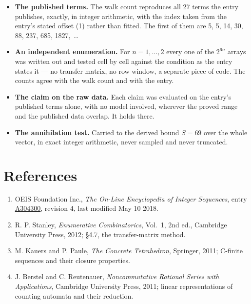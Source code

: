 \documentclass[11pt]{article}
\theoremstyle{definition}
\begin{document}
\begin{itemize}

\item {\bfseries The published terms.} The walk count reproduces all 27 terms the entry publishes, exactly, in integer arithmetic, with the index taken from the entry's stated offset (1) rather than fitted. The first of them are 5, 5, 14, 30, 88, 237, 685, 1827,~\dots

\item {\bfseries An independent enumeration.} For $n = 1,\dots,2$ every one of the $2^{6n}$ arrays was written out and tested cell by cell against the condition as the entry states it --- no transfer matrix, no row window, a separate piece of code. The counts agree with the walk count and with the entry.

\item {\bfseries The claim on the raw data.} Each claim was evaluated on the entry's published terms alone, with no model involved, wherever the proved range and the published data overlap. It holds there.

\item {\bfseries The annihilation test.} Carried to the derived bound $S = 69$ over the whole vector, in exact integer arithmetic, never sampled and never truncated.

\end{itemize}

\section{References}

\begin{enumerate}

\item OEIS Foundation Inc., \emph{The On-Line Encyclopedia of Integer Sequences}, entry \href{https://oeis.org/A304300}{A304300}, revision 4, last modified May 10 2018.

\item R. P. Stanley, \emph{Enumerative Combinatorics}, Vol.~1, 2nd ed., Cambridge University Press, 2012; \S4.7, the transfer-matrix method.

\item M. Kauers and P. Paule, \emph{The Concrete Tetrahedron}, Springer, 2011; C-finite sequences and their closure properties.

\item J. Berstel and C. Reutenauer, \emph{Noncommutative Rational Series with Applications}, Cambridge University Press, 2011; linear representations of counting automata and their reduction.

\end{enumerate}
\end{document}
